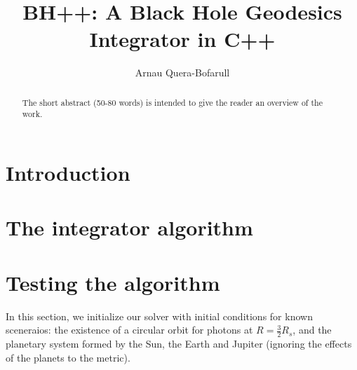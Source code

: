 \documentclass[journal, a4paper]{IEEEtran}
\begin{document}
	\title{ BH++: A Black Hole Geodesics Integrator in C++}
	\author{Arnau Quera-Bofarull}	
	\maketitle

\begin{abstract}
	The short abstract (50-80 words) is intended to give the reader an overview of the work.
\end{abstract}

\section{Introduction}

\section{The integrator algorithm}

\section{Testing the algorithm}
In this section, we initialize our solver with initial conditions for known sceneraios: the existence of a circular orbit for photons at $R=\frac{3}{2}R_s$, and the planetary system formed by the Sun, the Earth and Jupiter (ignoring the effects of the planets to the metric).
\end{document}

